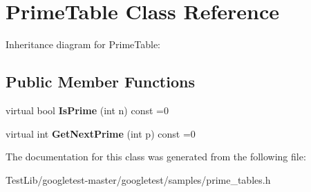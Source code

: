 \hypertarget{classPrimeTable}{}\section{Prime\+Table Class Reference}
\label{classPrimeTable}


Inheritance diagram for Prime\+Table\+:
\subsection*{Public Member Functions}
\begin{DoxyCompactItemize}
\item 
\mbox{\label{classPrimeTable_a2ab9243364ded0c51541f641b2df362a}} 
virtual bool {\bfseries Is\+Prime} (int n) const =0
\item 
\mbox{\label{classPrimeTable_ae537c939f56617d8937d57bbbae3ab30}} 
virtual int {\bfseries Get\+Next\+Prime} (int p) const =0
\end{DoxyCompactItemize}


The documentation for this class was generated from the following file\+:\begin{DoxyCompactItemize}
\item 
Test\+Lib/googletest-\/master/googletest/samples/prime\+\_\+tables.\+h\end{DoxyCompactItemize}
